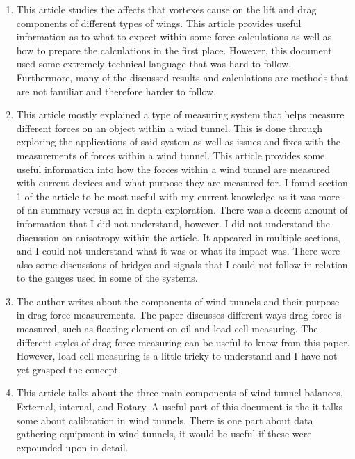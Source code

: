 \documentclass[12pt,letterpaper]{article}
\begin{document}
\begin{enumerate}
	\item \cite{Gerontakos2007} This article studies the affects that vortexes cause on the lift and drag components of different types of wings. This article provides useful information as to what to expect within some force calculations as well as how to prepare the calculations in the first place. However, this document used some extremely technical language that was hard to follow. Furthermore, many of the discussed results and calculations are methods that are not familiar and therefore harder to follow.
	\item \cite{Portman2009} This article mostly explained a type of measuring system that helps measure different forces on an object within a wind tunnel. This is done through exploring the applications of said system as well as issues and fixes with the measurements of forces within a wind tunnel. This article provides some useful information into how the forces within a wind tunnel are measured with current devices and what purpose they are measured for. I found section 1 of the article to be most useful with my current knowledge as it was more of an summary versus an in-depth exploration. There was a decent amount of information that I did not understand, however. I did not understand the discussion on anisotropy within the article. It appeared in multiple sections, and I could not understand what it was or what its impact was. There were also some discussions of bridges and signals that I could not follow in relation to the gauges used in some of the systems.
	\item \cite{Nan2013} The author writes about the components of wind tunnels and their purpose in drag force measurements. The paper discusses different ways drag force is measured, such as floating-element on oil and load cell measuring. The different styles of drag force measuring can be useful to know from this paper. However, load cell measuring is a little tricky to understand and I have not yet grasped the concept. 
	
	
	\item \cite{Gonzalez} This article talks about the three main components of wind tunnel balances, External, internal, and Rotary. A useful part of this document is the it talks some about calibration in wind tunnels. There is one part about data gathering equipment in wind tunnels, it would be useful if these were expounded upon in detail.  
\end{enumerate}

\printbibliography
\end{document}
